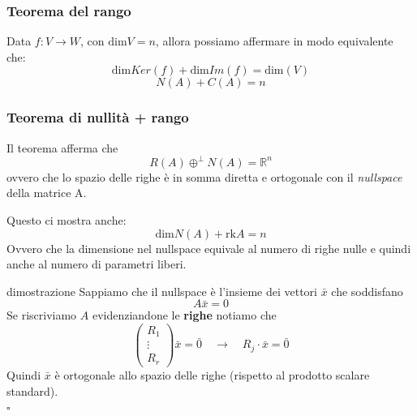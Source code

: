 \documentclass[x11names]{article}
\newcommand*{\QEDB}{\null\nobreak\hfill\ensuremath{\square}}%
\begin{document}
\begin{center}
	\colorbox{myred}{\begin{minipage}{5.75in}
			\begin{redes}{}
								\subsubsection{Teorema del rango}
				Data $f: V \to W$, con $\text{dim}V = n$, allora possiamo affermare in modo equivalente che:
				\[
				\text{dim}Ker(f) + \text{dim}Im(f) = \text{dim}(V)
				\]
				\[
				N(A) + C(A) = n
				\]
				
				
			\end{redes}
	\end{minipage}}        
\end{center}

\begin{center}
	\colorbox{myred}{\begin{minipage}{5.75in}
			\begin{redes}{}
								\subsubsection{Teorema di nullità + rango}
				Il teorema afferma che
				\[
				R(A) \oplus^\perp N(A) = \mathbb{R}^n
				\]
				ovvero che lo spazio delle righe è in somma diretta e ortogonale con il \textit{nullspace} della matrice A.
				
				Questo ci mostra anche:
				\[
				\text{dim}N(A) + \text{rk}A = n
				\]
				Ovvero che la dimensione nel nullspace equivale al numero di righe nulle e quindi anche al numero di parametri liberi.
				
			\end{redes}
	\end{minipage}}        
\end{center}

\begin{es}{dimostrazione}
	Sappiamo che il nullspace è l'insieme dei vettori $\bar{x}$ che soddisfano
	\[
	A\bar{x} = 0
	\]
	Se riscriviamo $A$ evidenziandone le \textbf{righe} notiamo che
	\[
	\left(\begin{array}{c}
		R_{1} \\
		\vdots \\
		R_{r}
	\end{array}\right)\bar{x} = \bar{0}
	\quad \to \quad R_{j} \cdot \bar{x} = \bar{0} 
	\]
	Quindi $\bar{x}$ è ortogonale allo spazio delle righe (rispetto al prodotto scalare standard).
	\\
	\QEDB
\end{es}
\end{document}
